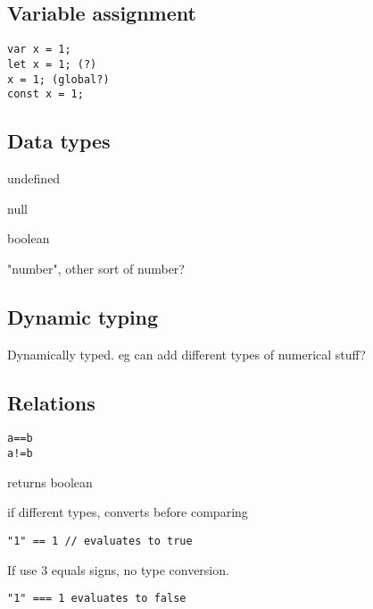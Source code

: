 

\subsection{Variable assignment}

\begin{verbatim}
var x = 1;
let x = 1; (?)
x = 1; (global?)
const x = 1;
\end{verbatim}

\subsection{Data types}

undefined

null

boolean

"number", other sort of number?

\subsection{Dynamic typing}

Dynamically typed. eg can add different types of numerical stuff?

\subsection{Relations}

\begin{verbatim}
a==b 
a!=b
\end{verbatim}

returns boolean

if different types, converts before comparing

\begin{verbatim}
"1" == 1 // evaluates to true
\end{verbatim}

If use \(3\) equals signs, no type conversion.

\begin{verbatim}
"1" === 1 evaluates to false
\end{verbatim}

